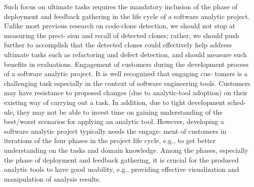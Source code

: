 \documentclass{llncs}
\begin{document}
Such focus on ultimate tasks requires the mandatory inclusion of the phase of deployment and feedback gathering in the life cycle of a software analytic project. Unlike most previous research on code-clone detection, we should not stop at measuring the preci- sion and recall of detected clones; rather, we should push further to accomplish that the detected clones could effectively help address ultimate tasks such as refactoring and defect detection, and should measure such benefits in evaluations. Engagement of customers during the development process of a
software analytic project. It is well recognized that engaging cus- tomers is a challenging task especially in the context of software engineering tools. Customers may have resistance to proposed changes (due to analytic-tool adoption) on their existing way of carrying out a task. In addition, due to tight development sched- ule, they may not be able to invest time on gaining understanding of the best/worst scenarios for applying an analytic tool. However, developing a software analytic project typically needs the engage- ment of customers in iterations of the four phases in the project life cycle, e.g., to get better understanding on the tasks and domain knowledge. Among the phases, especially the phase of deployment and feedback gathering, it is crucial for the produced analytic tools to have good usability, e.g., providing effective visualization and manipulation of analysis results.
\end{document}
